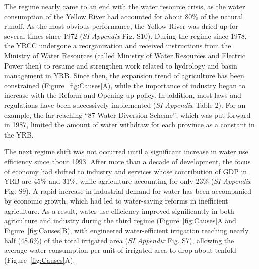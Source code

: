 \documentclass[9pt, twocolumn, twoside, lineno]{pnas-new}
\begin{document}
The regime nearly came to an end with the water resource crisis, as the water consumption of the Yellow River had accounted for about 80\% of the natural runoff. As the most obvious performance, the Yellow River was dried up for several times since 1972 (\textit{SI Appendix} Fig. S10). 
During the regime since 1978, the YRCC undergone a reorganization and received instructions from the Ministry of Water Resources (called Ministry of Water Resources and Electric Power then) to resume and strengthen work related to hydrology and basin management in YRB.
Since then, the expansion trend of agriculture has been constrained (Figure~\ref{fig:Causes}A), while the importance of industry began to increase with the Reform and Opening-up policy. In addition, most laws and regulations have been successively implemented (\textit{SI Appendix} Table 2). For an example, the far-reaching “87 Water Diversion Scheme”, which was put forward in 1987, limited the amount of water withdraw for each province as a constant in the YRB.

The next regime shift was not occurred until a significant increase in water use efficiency since about 1993. 
After more than a decade of development, the focus of economy had shifted to industry and services whose contribution of GDP in YRB are 45\% and 31\%, while agriculture accounting for only 23\% (\textit{SI Appendix} Fig. S9).
A rapid increase in industrial demand for water has been accompanied by economic growth, which had led to water-saving reforms in inefficient agriculture. As a result, water use efficiency improved significantly in both agriculture and industry during the third regime (Figure~\ref{fig:Causes}A and Figure~\ref{fig:Causes}B), with engineered water-efficient irrigation reaching nearly half (48.6\%) of the total irrigated area (\textit{SI Appendix} Fig. S7), allowing the average water consumption per unit of irrigated area to drop about tenfold (Figure~\ref{fig:Causes}A).
\end{document}
